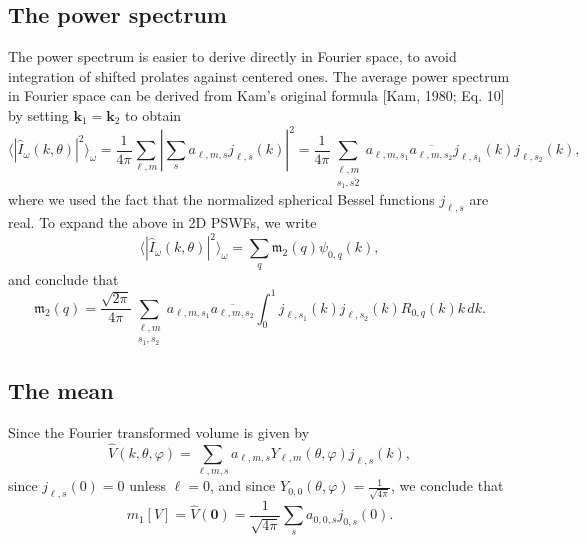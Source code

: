 \documentclass{amsart}
\theoremstyle{definition}
\theoremstyle{remark}
\numberwithin{equation}{section}
\newcommand{\mb}{\mathbf}
\begin{document}
\subsection{The power spectrum}
The power spectrum is easier to derive directly in Fourier space, to
avoid integration of shifted prolates against centered ones. The
average power spectrum in Fourier space can be derived from Kam's
original formula [Kam, 1980; Eq. 10] by setting $\mb k_1 = \mb k_2$ to
obtain
\[ \langle |\widehat I_{\omega}(k,\theta)|^2\rangle_{\omega} =
  \frac{1}{4\pi}\sum_{\ell,
    m}\left|\sum_sa_{\ell,m,s}j_{\ell,s}(k)\right|^2 =
  \frac{1}{4\pi}\sum_{\substack{\ell,m\\s_1,s2}}a_{\ell,m,s_1}\overline{a_{\ell,m,s_2}}j_{\ell,s_1}(k)j_{\ell,s_2}(k),\]
where we used the fact that the normalized spherical Bessel functions
$j_{\ell,s}$ are real. To expand the above in 2D PSWFs, we write
\[ \langle |\widehat I_{\omega}(k,\theta)|^2\rangle_{\omega} =
  \sum_{q}\mathfrak{m}_2(q)\psi_{0,q}(k),\]
and conclude that
\[ \mathfrak{m}_2(q) =
  \frac{\sqrt{2\pi}}{4\pi}\sum_{\substack{\ell,m\\s_1,s_2}}a_{\ell,m,s_1}\overline{a_{\ell,m,s_2}}
  \int_0^1j_{\ell,s_1}(k)j_{\ell,s_2}(k)R_{0,q}(k)k\, dk.\]

\subsection{The mean}

Since the Fourier transformed volume is given by
\[ \widehat V(k,\theta,\varphi) =
  \sum_{\ell,m,s}a_{\ell,m,s}Y_{\ell,m}(\theta,\varphi)j_{\ell,s}(k),\]
since $j_{\ell,s}(0)=0$ unless $\ell=0$, and since
$Y_{0,0}(\theta,\varphi) = \frac{1}{\sqrt{4\pi}}$, we conclude that
\[ m_1[V] = \widehat V(\mb 0) = \frac{1}{\sqrt{4\pi}}\sum_sa_{0,0,s}j_{0,s}(0).\]
\end{document}
